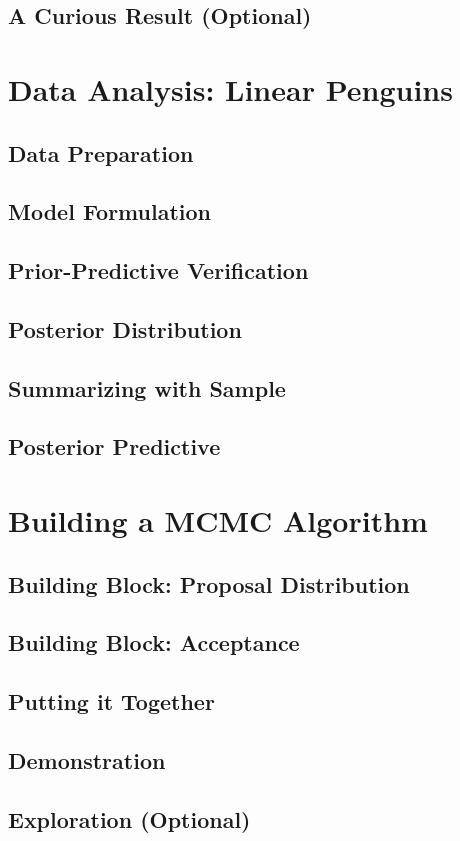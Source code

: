 \documentclass[]{article}
\begin{document}
\subsection{A Curious Result (Optional)}

\section{Data Analysis: Linear Penguins}

\subsection{Data Preparation}

\subsection{Model Formulation}


\subsection{Prior-Predictive Verification}

\subsection{Posterior Distribution}

\subsection{Summarizing with Sample}

\subsection{Posterior Predictive}

\section{Building a MCMC Algorithm}

\subsection{Building Block: Proposal Distribution}

\subsection{Building Block: Acceptance}

\subsection{Putting it Together}

\subsection{Demonstration}

\subsection{Exploration (Optional)}
\end{document}
